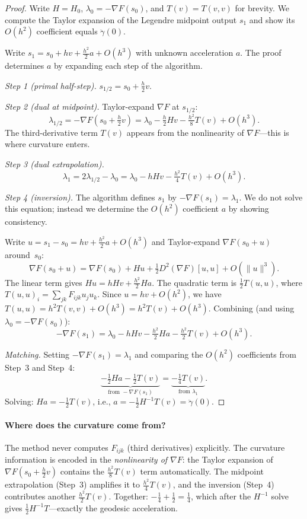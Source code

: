 \documentclass[11pt]{article}
\begin{document}
\begin{proof}
Write $H = H_0$, $\lambda_0 = -\nabla F(s_0)$, and
$T(v) = T(v,v)$ for brevity.  We compute the Taylor expansion
of the Legendre midpoint output $s_1$ and show its $O(h^2)$ coefficient
equals $\ddot\gamma(0)$.

Write $s_1 = s_0 + hv + \frac{h^2}{2}a + O(h^3)$ with unknown
acceleration $a$.  The proof determines $a$ by expanding each
step of the algorithm.

\medskip\noindent
\textit{Step 1 (primal half-step).}\quad
$s_{1/2} = s_0 + \frac{h}{2}v$.

\medskip\noindent
\textit{Step 2 (dual at midpoint).}\quad
Taylor-expand $\nabla F$ at $s_{1/2}$:
\[
  \lambda_{1/2} = -\nabla F\!\left(s_0 + \tfrac{h}{2}v\right)
  = \lambda_0 - \tfrac{h}{2}Hv - \tfrac{h^2}{8}T(v) + O(h^3).
\]
The third-derivative term $T(v)$ appears from the nonlinearity
of $\nabla F$---this is where curvature enters.

\medskip\noindent
\textit{Step 3 (dual extrapolation).}\quad
\[
  \lambda_1 = 2\lambda_{1/2} - \lambda_0
  = \lambda_0 - hHv - \tfrac{h^2}{4}T(v) + O(h^3).
\]

\medskip\noindent
\textit{Step 4 (inversion).}\quad
The algorithm defines $s_1$ by $-\nabla F(s_1) = \lambda_1$.
We do not solve this equation; instead we determine the $O(h^2)$
coefficient $a$ by showing consistency.

Write $u = s_1 - s_0 = hv + \frac{h^2}{2}a + O(h^3)$ and
Taylor-expand $\nabla F(s_0 + u)$ around~$s_0$:
\[
  \nabla F(s_0 + u)
  = \nabla F(s_0) + Hu + \tfrac{1}{2}D^2(\nabla F)[u,u] + O(\|u\|^3).
\]
The linear term gives $Hu = hHv + \frac{h^2}{2}Ha$.
The quadratic term is $\frac{1}{2}T(u,u)$, where
$T(u,u)_i = \sum_{jk}F_{ijk}u_j u_k$.  Since $u = hv + O(h^2)$,
we have $T(u,u) = h^2 T(v,v) + O(h^3) = h^2 T(v) + O(h^3)$.
Combining (and using $\lambda_0 = -\nabla F(s_0)$):
\[
  -\nabla F(s_1) = \lambda_0 - hHv
    - \tfrac{h^2}{2}Ha - \tfrac{h^2}{2}T(v) + O(h^3).
\]

\medskip\noindent
\textit{Matching.}\quad
Setting $-\nabla F(s_1) = \lambda_1$ and comparing the $O(h^2)$
coefficients from Step~3 and Step~4:
\[
  \underbrace{-\tfrac{1}{2}Ha - \tfrac{1}{2}T(v)}_{\text{from }
    -\nabla F(s_1)}
  = \underbrace{-\tfrac{1}{4}T(v)}_{\text{from }\lambda_1}.
\]
Solving: $Ha = -\frac{1}{2}T(v)$, i.e.,
$a = -\frac{1}{2}H^{-1}T(v) = \ddot\gamma(0)$. \qedhere
\end{proof}

\paragraph{Where does the curvature come from?}
The method never computes $F_{ijk}$ (third derivatives) explicitly.
The curvature information is encoded in the
\emph{nonlinearity of $\nabla F$}: the Taylor expansion of
$\nabla F(s_0 + \frac{h}{2}v)$ contains the $\frac{h^2}{8}T(v)$ term
automatically.  The midpoint extrapolation (Step~3) amplifies it to
$\frac{h^2}{4}T(v)$, and the inversion (Step~4) contributes another
$\frac{h^2}{2}T(v)$.  Together:
$-\frac{1}{4} + \frac{1}{2} = \frac{1}{4}$, which after the $H^{-1}$
solve gives $\frac{1}{2}H^{-1}T$---exactly the geodesic acceleration.
\end{document}
